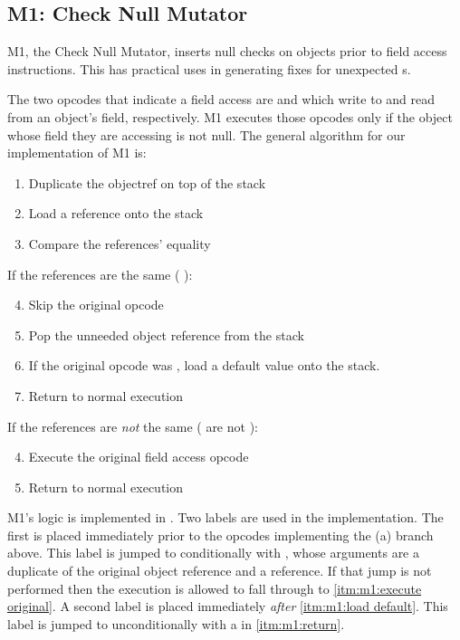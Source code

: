 \subsection{M1: Check Null Mutator}
M1, the Check Null Mutator, inserts null checks on objects prior to field access instructions.
This has practical uses in generating fixes for unexpected s.

The two opcodes that indicate a field access are  and  which write to and read from an object's field, respectively.
M1 executes those opcodes only if the object whose field they are accessing is not null.
The general algorithm for our implementation of M1 is:
\begin{enumerate}
\item
  Duplicate the objectref on top of the stack
\item
  Load a  reference onto the stack
\item
  Compare the references' equality
\end{enumerate}
\begin{minipage}[t]{0.45\linewidth}
  If the references are the same (\ie{} ):
  \begin{enumerate}[%
    leftmargin=*,%
    label={(\arabic*a)}
    ]
    \setcounter{enumi}{3}
  \item
    Skip the original opcode
  \item
    Pop the unneeded object reference from the stack
  \item\label{itm:m1:load default}
    If the original opcode was , load a default value onto the stack.
  \item
    Return to normal execution
  \end{enumerate}
\end{minipage}
\hfill\vline\hfill
\begin{minipage}[t]{0.5\linewidth}
  If the references are \textit{not} the same (\ie{} are not ):
  \begin{enumerate}[%
    leftmargin=*,%
    label={(\arabic*b)}
    ]
    \setcounter{enumi}{3}
  \item\label{itm:m1:execute original}
    Execute the original field access opcode
  \item\label{itm:m1:return}
    Return to normal execution
  \end{enumerate}
\end{minipage}

\vspace*{2ex}

M1's logic is implemented in .
Two labels are used in the implementation.
The first is placed immediately prior to the opcodes implementing the (a) branch above.
This label is jumped to conditionally with , whose arguments are a duplicate of the original object reference and a  reference.
If that jump is not performed then the execution is allowed to fall through to \ref{itm:m1:execute original}.
A second label is placed immediately \textit{after} \ref{itm:m1:load default}.
This label is jumped to unconditionally with a  in \ref{itm:m1:return}.

